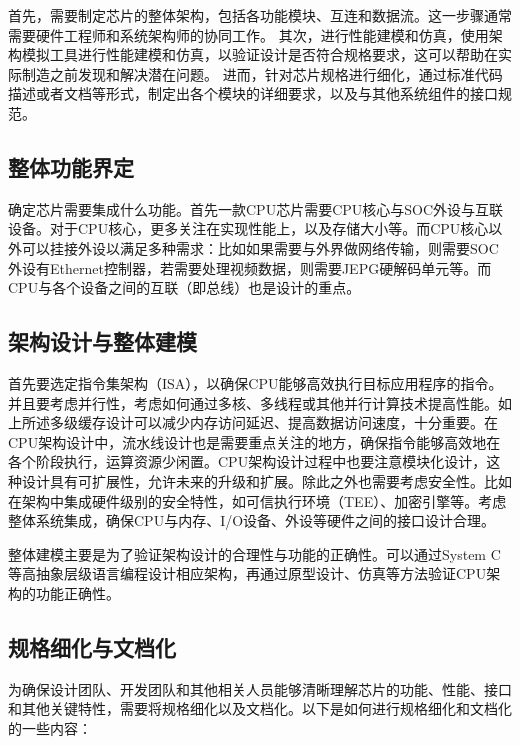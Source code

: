 首先，需要制定芯片的整体架构，包括各功能模块、互连和数据流。这一步骤通常需要硬件工程师和系统架构师的协同工作。
其次，进行性能建模和仿真，使用架构模拟工具进行性能建模和仿真，以验证设计是否符合规格要求，这可以帮助在实际制造之前发现和解决潜在问题。
进而，针对芯片规格进行细化，通过标准代码描述或者文档等形式，制定出各个模块的详细要求，以及与其他系统组件的接口规范。

\subsection{整体功能界定}\label{sec:16-chip-frontend-008}

确定芯片需要集成什么功能。首先一款CPU芯片需要CPU核心与SOC外设与互联设备。对于CPU核心，更多关注在实现性能上，以及存储大小等。而CPU核心以外可以挂接外设以满足多种需求：比如如果需要与外界做网络传输，则需要SOC外设有Ethernet控制器，若需要处理视频数据，则需要JEPG硬解码单元等。而CPU与各个设备之间的互联（即总线）也是设计的重点。

\subsection{架构设计与整体建模}\label{sec:16-chip-frontend-009}

首先要选定指令集架构（ISA），以确保CPU能够高效执行目标应用程序的指令。并且要考虑并行性，考虑如何通过多核、多线程或其他并行计算技术提高性能。如上所述多级缓存设计可以减少内存访问延迟、提高数据访问速度，十分重要。在CPU架构设计中，流水线设计也是需要重点关注的地方，确保指令能够高效地在各个阶段执行，运算资源少闲置。CPU架构设计过程中也要注意模块化设计，这种设计具有可扩展性，允许未来的升级和扩展。除此之外也需要考虑安全性。比如在架构中集成硬件级别的安全特性，如可信执行环境（TEE）、加密引擎等。考虑整体系统集成，确保CPU与内存、I/O设备、外设等硬件之间的接口设计合理。

整体建模主要是为了验证架构设计的合理性与功能的正确性。可以通过System
C等高抽象层级语言编程设计相应架构，再通过原型设计、仿真等方法验证CPU架构的功能正确性。

\subsection{规格细化与文档化}\label{sec:16-chip-frontend-010}

为确保设计团队、开发团队和其他相关人员能够清晰理解芯片的功能、性能、接口和其他关键特性，需要将规格细化以及文档化。以下是如何进行规格细化和文档化的一些内容：

